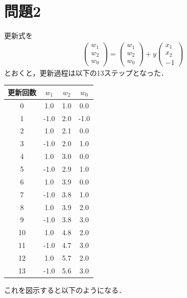 \section*{問題2}
\noindent
更新式を
\begin{eqnarray*}
    \left(\begin{array}{c}w_1\\w_2\\w_0\end{array}\right)=\left(\begin{array}{c}w_1\\w_2\\w_0\end{array}\right)+y\left(\begin{array}{c}x_1\\x_2\\-1\end{array}\right)
\end{eqnarray*}
とおくと，更新過程は以下の13ステップとなった．
\begin{table}[H]
    \begin{center}
        \begin{tabular}{c|ccc}
            \hline
            更新回数 & $w_1$ & $w_2$ & $w_0$\\
            \hline \hline
            0 & 1.0 & 1.0 & 0.0\\
            1 & -1.0 & 2.0 & -1.0\\
            2 & 1.0 & 2.1 & 0.0\\
            3 & -1.0 & 2.0 & 1.0\\
            4 & 1.0 & 3.0 & 0.0\\
            5 & -1.0 & 2.9 & 1.0\\
            6 & 1.0 & 3.9 & 0.0\\
            7 & -1.0 & 3.8 & 1.0\\
            8 & 1.0 & 3.9 & 2.0\\
            9 & -1.0 & 3.8 & 3.0\\
            10 & 1.0 & 4.8 & 2.0\\
            11 & -1.0 & 4.7 & 3.0\\
            12 & 1.0 & 5.7 & 2.0\\
            13 & -1.0 & 5.6 & 3.0\\
            \hline
        \end{tabular}
    \end{center}
\end{table}
これを図示すると以下のようになる．
